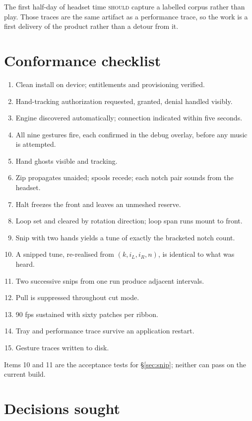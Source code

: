 \documentclass[11pt,a4paper]{article}
\newcommand{\SHOULD}{\textsc{should}}
\theoremstyle{definition}
\theoremstyle{plain}
\theoremstyle{remark}
\begin{document}
The first half-day of headset time \SHOULD{} capture a labelled corpus rather than play. Those
traces are the same artifact as a performance trace, so the work is a first delivery of the product
rather than a detour from it.

\section{Conformance checklist}

\begin{enumerate}[leftmargin=*,itemsep=0.15em]
\item Clean install on device; entitlements and provisioning verified.
\item Hand-tracking authorization requested, granted, denial handled visibly.
\item Engine discovered automatically; connection indicated within five seconds.
\item All nine gestures fire, each confirmed in the debug overlay, before any music is attempted.
\item Hand ghosts visible and tracking.
\item Zip propagates unaided; spools recede; each notch pair sounds from the headset.
\item Halt freezes the front and leaves an unmeshed reserve.
\item Loop set and cleared by rotation direction; loop span runs mount to front.
\item Snip with two hands yields a tune of exactly the bracketed notch count.
\item A snipped tune, re-realised from $(k,i_L,i_R,n)$, is identical to what was heard.
\item Two successive snips from one run produce adjacent intervals.
\item Pull is suppressed throughout cut mode.
\item 90 fps sustained with sixty patches per ribbon.
\item Tray and performance trace survive an application restart.
\item Gesture traces written to disk.
\end{enumerate}

Items 10 and 11 are the acceptance tests for \S\ref{sec:snip}; neither can pass on the current
build.

\section{Decisions sought}
\label{sec:decisions}
\end{document}

